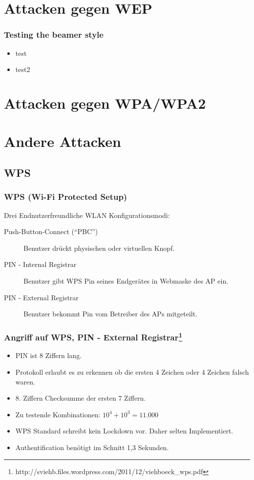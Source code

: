 \documentclass{beamer}
\begin{document}
\section{Attacken gegen WEP}
\begin{frame}
\frametitle{Testing the beamer style}
\begin{itemize}
	\item test
	\item test2
\end{itemize}
\end{frame}

\section{Attacken gegen WPA/WPA2}

\section{Andere Attacken}
\subsection{WPS}
\begin{frame}
\frametitle{WPS (Wi-Fi Protected Setup)}
Drei Endnutzerfreundliche WLAN Konfigurationsmodi:
\begin{description}
	\item[Push-Button-Connect (“PBC”)] Benutzer drückt physischen oder virtuellen Knopf.
	\item[PIN - Internal Registrar] Benutzer gibt WPS Pin seines Endgerätes in Webmaske des AP ein.
	\item[PIN - External Registrar] Benutzer bekommt Pin vom Betreiber des APs mitgeteilt.
\end{description}

\end{frame}
\begin{frame}
\frametitle{Angriff auf WPS, PIN - External Registrar\footnote{http://sviehb.files.wordpress.com/2011/12/viehboeck\_wps.pdf}}
\begin{itemize}
	\item PIN ist 8 Ziffern lang.
	\item Protokoll erlaubt es zu erkennen ob die ersten 4 Zeichen oder 4 Zeichen falsch waren.
	\item 8. Ziffern Checksumme der ersten 7 Ziffern.
	\item Zu testende Kombinationen: $10^4+10^3 = 11.000$
	\item WPS Standard schreibt kein Lockdown vor. Daher selten Implementiert.
	\item Authentification benötigt im Schnitt 1,3 Sekunden.
\end{itemize}
\end{frame}
\end{document}
